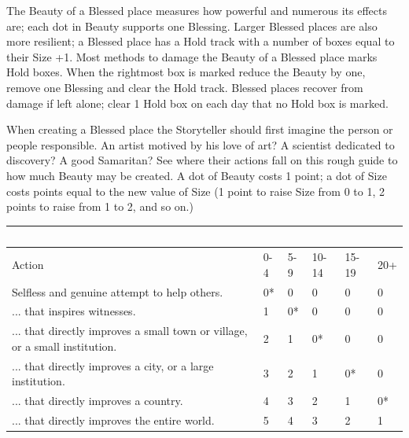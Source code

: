 \noindent The Beauty of a Blessed place measures how powerful and numerous its effects are; each dot in Beauty supports one Blessing. Larger Blessed places are also more resilient; a Blessed place has a Hold track with a number of boxes equal to their Size +1. Most methods to damage the Beauty of a Blessed place marks Hold boxes. When the rightmost box is marked reduce the Beauty by one, remove one Blessing and clear the Hold track. Blessed places recover from damage if left alone; clear 1 Hold box on each day that no Hold box is marked.

When creating a Blessed place the Storyteller should first imagine the person or people responsible. An artist motived by his love of art? A scientist dedicated to discovery? A good Samaritan? See where their actions fall on this rough guide to how much Beauty may be created. A dot of Beauty costs 1 point; a dot of Size costs points equal to the new value of Size (1 point to raise Size from 0 to 1, 2 points to raise from 1 to 2, and so on.)

\begin{table}[H]
    \begin{tabular}{|l|l|l|l|l|l|}
        \hline
        ~                                                                                         & ~   & ~   & ~     & ~     & ~   \\ \hline
        Action                                                                                    & 0-4 & 5-9 & 10-14 & 15-19 & 20+ \\ \hline
        Selfless and genuine attempt to help others.                                   & 0*  & 0   & 0     & 0     & 0   \\ \hline
        ... that inspires witnesses.   & 1   & 0*  & 0     & 0     & 0   \\ \hline
        ... that directly improves a small town or village, or a small institution.                                                                                          & 	2  & 1   & 0*    & 0     & 0   \\ \hline
       ... that directly improves a city, or a large institution.                   & 3   & 	2  & 1     & 0*    & 0   \\ \hline
        ... that directly improves a country.                     & 4   & 3   & 	2    & 1     & 0*  \\ \hline
        ... that directly improves the entire world.                             & 5   & 4   & 3     & 	2    & 1   \\
        \hline
    \end{tabular}
\end{table}

